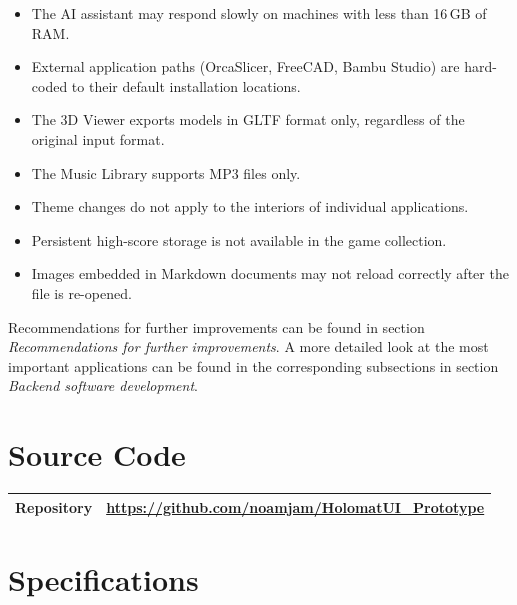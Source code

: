 \documentclass[a4paper,12pt]{article}
\begin{document}
\begin{itemize}[leftmargin=1.5em]
    \item The AI assistant may respond slowly on machines with less than 16\,GB of RAM.
    \item External application paths (OrcaSlicer, FreeCAD, Bambu Studio) are hard-coded to their default installation locations.
    \item The 3D Viewer exports models in GLTF format only, regardless of the original input format.
    \item The Music Library supports MP3 files only.
    \item Theme changes do not apply to the interiors of individual applications.
    \item Persistent high-score storage is not available in the game collection.
    \item Images embedded in Markdown documents may not reload correctly after the file is re-opened.
\end{itemize}
 
Recommendations for further improvements can be found in section \textit{Recommendations for further improvements}. 
A more detailed look at the most important applications can be found in the corresponding subsections in section \textit{Backend software development}. 

\section{Source Code}
 
\begin{center}
\begin{tabular}{>{\bfseries}p{3cm} p{10cm}}
\toprule
Repository & \url{https://github.com/noamjam/HolomatUI\_Prototype} \\
\bottomrule
\end{tabular}
\end{center}
 

\newpage
\section{Specifications}
\end{document}
